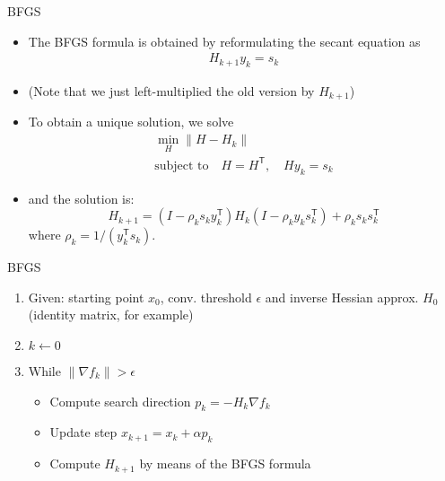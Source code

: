 \documentclass{beamer}
\newcommand{\tran}{\mathsf{T}}
\begin{document}
\begin{frame}[allowframebreaks]{BFGS}
	\newpage
	
	\begin{itemize}
		\item The BFGS formula is obtained by reformulating the secant equation as
		\begin{gather}
		H_{k+1} y_k = s_k
		\end{gather}
		\item (Note that we just left-multiplied the old version by $H_{k+1}$)
		\item To obtain a unique solution, we solve
		\begin{subequations}
			\begin{gather}
			\min_H \| H- H_k \|\\
			\text{subject to}\quad H=H^\tran,\quad H y_k = s_k
			\end{gather}
		\end{subequations}
		\item and the solution is:
		\begin{equation}
		H_{k+1} = (I-\rho_k s_k y_k^\tran) H_k (I - \rho_k y_k s_k^\tran) + \rho_k s_k s_k^\tran
		\end{equation}
		where $\rho_k = 1/(y_k^\tran s_k)$.
	\end{itemize}

	\newpage
	
	\begin{block}{BFGS}
		\begin{enumerate}
			\item Given: starting point $x_0$, conv. threshold $\epsilon$ and inverse Hessian approx. $H_0$ (identity matrix, for example)
			\item $k \leftarrow 0$
			\item While $\| \nabla f_k \| > \epsilon$
			\begin{itemize}
				\item Compute search direction $p_k = -H_k \nabla f_k$
				\item Update step $x_{k+1} = x_k + \alpha p_k$
				\item Compute $H_{k+1}$ by means of the BFGS formula
			\end{itemize}
		\end{enumerate}
	\end{block}
\end{frame}
\end{document}
